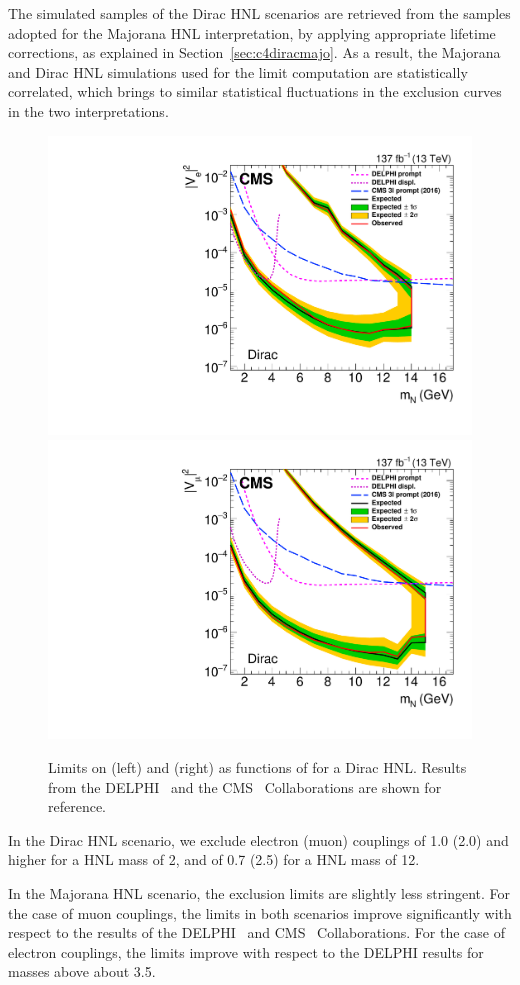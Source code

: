 The simulated samples of the Dirac HNL scenarios are retrieved from
the samples adopted for the Majorana HNL interpretation, by
applying appropriate lifetime corrections, as explained in Section~\ref{sec:c4diracmajo}.
As a result, the Majorana and Dirac HNL simulations used for the limit
computation are statistically correlated, which brings to
similar statistical fluctuations in the exclusion curves in the two
interpretations.\\

\begin{figure}[h!]
    \centering
    \includegraphics[width=.48\textwidth]{Figures/paper/dirac_ele.pdf}
    \hfill
    \includegraphics[width=.48\textwidth]{Figures/paper/dirac_muo.pdf}
    \caption{\label{fig:limits_Dir}
        Limits on \mixpare (left) and \mixparm (right) as
        functions of \mhnl for a Dirac HNL. Results from the DELPHI~\cite{Abreu:1996pa}
        and the CMS~\cite{Sirunyan:2018mtv} Collaborations are shown
        for reference. \kirill
    }
\end{figure}
\vspace{5cm}
In the Dirac HNL scenario, we exclude electron (muon) couplings of
1.0 (2.0) and higher for a HNL mass of
2\GeV, and of 0.7 (2.5) for a HNL mass of
12\GeV.

In the Majorana HNL scenario, the exclusion limits are slightly less stringent.
For the case of muon couplings, the limits in both scenarios improve
significantly with respect to the results of the
DELPHI~\cite{Abreu:1996pa} and
CMS~\cite{Sirunyan:2018mtv} Collaborations.
For the case of electron couplings, the limits improve with
respect to the DELPHI results for masses above about 3.5\GeV.

